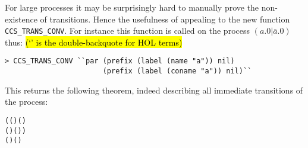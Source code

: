 For large processes it may be surprisingly hard to manually prove the
non-existence of transitions.  Hence the usefulness of appealing to 
the new  function \texttt{CCS\_TRANS\_CONV}. 
For instance this function
is called on the  process $(a.0 | \bar{a}.0)$ thus:
\hl{(`\mbox{}' is the double-backquote for HOL terms)}
\begin{lstlisting}
> CCS_TRANS_CONV ``par (prefix (label (name "a")) nil)
                       (prefix (label (coname "a")) nil)``
\end{lstlisting}
This returns the following theorem, indeed describing all immediate
transitions of the process:
\begin{alltt}
\HOLTokenTurnstile{}   \HOLSymConst{\ensuremath{\parallel}}   \HOLTokenTransBegin{}\HOLTokenTransEnd {} \HOLSymConst{\HOLTokenEquiv{}}
   (( \HOLSymConst{=}  ) \HOLSymConst{\HOLTokenConj{}} ( \HOLSymConst{=}  \HOLSymConst{\ensuremath{\parallel}}  ) \HOLSymConst{\HOLTokenDisj{}}
    ( \HOLSymConst{=}  ) \HOLSymConst{\HOLTokenConj{}} ( \HOLSymConst{=}   \HOLSymConst{\ensuremath{\parallel}} )) \HOLSymConst{\HOLTokenDisj{}}
   ( \HOLSymConst{=} \HOLSymConst{\ensuremath{\tau}}) \HOLSymConst{\HOLTokenConj{}} ( \HOLSymConst{=}  \HOLSymConst{\ensuremath{\parallel}} )
\end{alltt}
